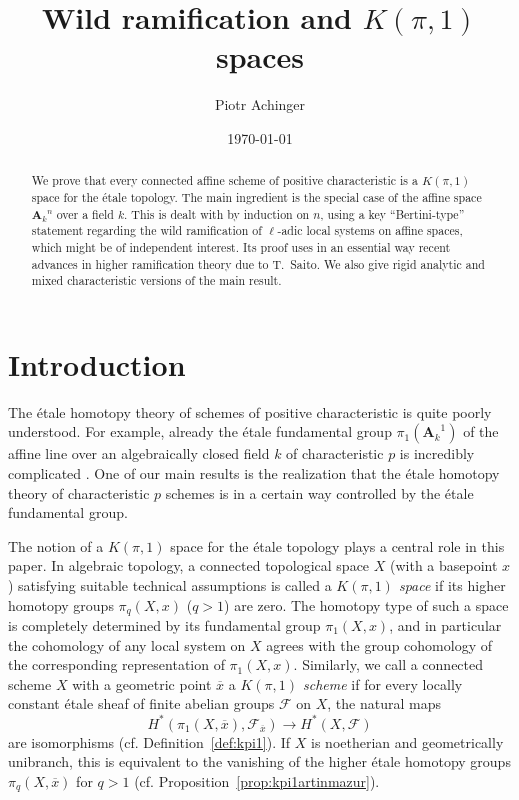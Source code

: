 \documentclass[twoside]{amsart}
\author[P. Achinger]{Piotr Achinger}
\title{Wild ramification and $K(\pi, 1)$ spaces}
\date{\today}
\renewcommand{\AA}{\mathbf{A}}
\newcommand{\Ff}{\mathscr{F}}
\newcommand{\ANK}[2]{{\AA_{#2}}^{\! \! \! \!  #1}} %
\newcommand{\AN}[1]{\ANK{#1}{k}}
\renewcommand{\to}{\longrightarrow}
\renewcommand{\bar}{\overline}
\theoremstyle{plain}
\theoremstyle{definition}
\theoremstyle{remark}
\numberwithin{equation}{subsection}
\begin{document}
\begin{abstract}
	We prove that every connected affine scheme of positive characteristic is a $K(\pi, 1)$ space for the \'etale topology. The main ingredient is the special case of the affine space $\AN n$ over a field $k$. This is dealt with by induction on $n$, using a key ``Bertini-type'' statement regarding the wild ramification of $\ell$-adic local systems on affine spaces, which might be of independent interest. Its proof uses in an essential way recent advances in higher ramification theory due to T.~Saito. We also give rigid analytic and mixed characteristic versions of the main result.
\end{abstract}

\maketitle

\section{Introduction} \label{s:intro}


The \'etale homotopy theory of schemes of positive characteristic is quite poorly understood. For example, already the \'etale fundamental group $\pi_1(\AN 1)$ of the affine line over an algebraically closed field $k$ of characteristic $p$ is incredibly complicated \cite{Raynaud}.  One of our main results is the realization that the \'etale homotopy theory of characteristic $p$ schemes is in a certain way controlled by the \'etale fundamental group. 

The notion of a $K(\pi, 1)$ space for the \'etale topology plays a central role in this paper. In algebraic topology, a connected topological space $X$ (with a basepoint $x$) satisfying suitable technical assumptions is called a \emph{$K(\pi, 1)$ space} if its higher homotopy groups $\pi_q(X,x)$ ($q>1$) are zero. The homotopy type of such a space is completely determined by its fundamental group $\pi_1(X,x)$, and in particular the cohomology of any local system on $X$ agrees with the group cohomology of the corresponding representation of $\pi_1(X,x)$. Similarly, we call a connected scheme $X$ with a geometric point $\bar x$ a \emph{$K(\pi, 1)$ scheme} if for every locally constant \'etale sheaf of finite abelian groups $\Ff$ on $X$, the natural maps
\begin{equation} \label{eqn:rhomaps-intro} 
	H^*(\pi_1(X, \bar x), \Ff_{\bar x}) \to H^*(X, \Ff)
\end{equation}
are isomorphisms (cf. Definition~\ref{def:kpi1}). If $X$ is noetherian and geometrically unibranch, this is equivalent to the vanishing of the higher \'etale homotopy groups $\pi_q(X, \bar x)$ for $q>1$ (cf. Proposition~\ref{prop:kpi1artinmazur}).
\end{document}
